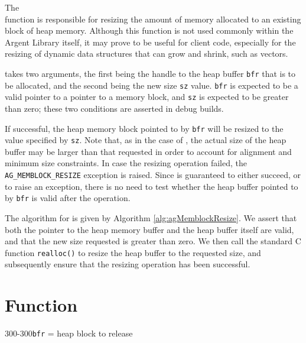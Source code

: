 The \agMemblockResize \\ function is responsible for resizing the amount of 
memory allocated to an existing block of heap memory. Although this function is 
not used commonly within the Argent Library itself, it may prove to be useful 
for client code, especially for the resizing of dynamic data structures that can
grow and shrink, such as vectors.

\agMemblockResize takes two arguments, the first being the handle to the heap
buffer \texttt{bfr} that is to be allocated, and the second being the new size 
\texttt{sz} value. \texttt{bfr} is expected to be a valid pointer to a pointer 
to a memory block, and \texttt{sz} is expected to be greater than zero; these 
two conditions are asserted in debug builds.


If successful, the heap memory block pointed to by \texttt{bfr} will be resized 
to the value specified by \texttt{sz}. Note that, as in the case of 
\agMemblockNew, the actual size of the heap buffer may be larger than that
requested in order to account for alignment and minimum size constraints. In
case the resizing operation failed, the \texttt{AG\_MEMBLOCK\_RESIZE} exception 
is raised. Since \agMemblockResize is guaranteed to either succeed, or to raise
an exception, there is no need to test whether the heap buffer pointed to by 
\texttt{bfr} is valid after the operation.

The algorithm for \agMemblockResize is given by Algorithm 
\ref{alg:agMemblockResize}. We assert that both the pointer to the heap memory 
buffer and the heap buffer itself are valid, and that the new size requested is 
greater than zero. We then call the standard C function \texttt{realloc()} to 
resize the heap buffer to the requested size, and subsequently ensure that the 
resizing operation has been successful.

%
%
\section{Function \agMemblockFree}
  {300-300}{\texttt{bfr} = heap block to release}
\kant[1]
